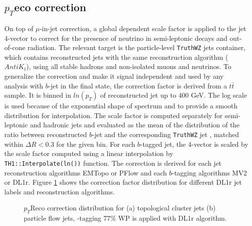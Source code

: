\subsection{\texorpdfstring{$p_T$}Reco correction}
\label{Jet:Cal:BCal:pTReco}
On top of $\mu$-in-jet correction, a global \pT dependent scale factor is applied to the jet 4-vector to correct for the presence of neutrino in semi-leptonic decays and out-of-cone radiation. The relevant target is the particle-level \texttt{TruthWZ} jets container, which contains reconstructed jets with the same reconstruction algorithm ($AntiK_t$), using all stable hadrons and non-isolated muons and neutrinos. To generalize the correction and make it signal independent and used by any analysis with $b$-jet in the final state, the correction factor is derived from a $t\bar{t}$ sample. It is binned in $ln(p_T)$ of reconstructed jet up to 400 GeV. The log scale is used because of the exponential shape of \pT spectrum and to provide a smooth distribution for interpolation. The scale factor is computed separately for semi-leptonic and hadronic jets and evaluated as the mean of the distribution of the ratio between reconstructed $b$-jet \pT and the corresponding \texttt{TruthWZ} jet \pT, matched within $\Delta R < 0.3$ for the given \pT bin. For each $b$-tagged jet, the 4-vector is scaled by the scale factor computed using a linear interpolation by \texttt{TH1::Interpolate(ln(\pT))} function. The correction is derived for each jet reconstruction algorithms EMTopo or PFlow and each $b$-tagging algorithms MV2 or DL1r. Figure \ref{fig:Jet:Cal:BCal:pTReco} shows the correction factor distribution for different DL1r jet labels and reconstruction algorithms. 
\begin{figure}[htbp]
   \centering
   \quad
   \begin{tcolorbox}[colback=black!5!white,colframe=white!75!black]
   \caption{$p_T$Reco correction distribution for (a) topological cluster jets (b) particle flow jets, \bq-tagging 77\% WP is applied with DL1r algorithm.}
   \label{fig:Jet:Cal:BCal:pTReco}
   \end{tcolorbox}
   
\end{figure}
